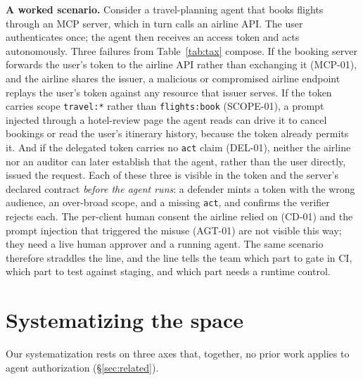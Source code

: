 \noindent\textbf{A worked scenario.} Consider a travel-planning agent that books
flights through an MCP server, which in turn calls an airline API. The user
authenticates once; the agent then receives an access token and acts autonomously.
Three failures from Table~\ref{tab:tax} compose. If the booking server forwards the
user's token to the airline API rather than exchanging it (MCP-01), and the airline
shares the issuer, a malicious or compromised airline endpoint replays the user's
token against any resource that issuer serves. If the token carries scope
\texttt{travel:*} rather than \texttt{flights:book} (SCOPE-01), a prompt injected
through a hotel-review page the agent reads can drive it to cancel bookings or read
the user's itinerary history, because the token already permits it. And if the
delegated token carries no \texttt{act} claim (DEL-01), neither the airline nor an
auditor can later establish that the agent, rather than the user directly, issued the
request. Each of these three is visible in the token and the server's declared
contract \emph{before the agent runs}: a defender mints a token with the wrong
audience, an over-broad scope, and a missing \texttt{act}, and confirms the verifier
rejects each. The per-client human consent the airline relied on (CD-01) and the prompt injection
that triggered the misuse (AGT-01) are not visible this way; they need a live human
approver and a running agent. The same scenario therefore straddles the line, and the
line tells the team which part to gate in CI, which part to test against staging, and
which part needs a runtime control.

\section{Systematizing the space}\label{sec:syst}
Our systematization rests on three axes that, together, no prior work applies to
agent authorization (\S\ref{sec:related}).

